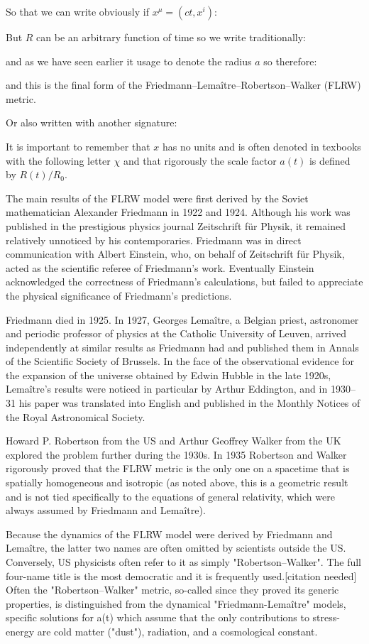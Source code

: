 	So that we can write obviously if $x^\mu=(ct,x^i)$:
	
	But $R$ can be an arbitrary function of time so we write traditionally:
	
	and as we have seen earlier it usage to denote the radius $a$ so therefore:
	
	and this is the final form of the Friedmann–Lemaître–Robertson–Walker (FLRW) metric.
	
	Or also written with another signature:
	
	
	It is important to remember that $x$ has no units and is often denoted in texbooks with the following letter $\chi$ and that rigorously the scale factor $a(t)$ is defined by $R(t)/R_0$.

	The main results of the FLRW model were first derived by the Soviet mathematician Alexander Friedmann in 1922 and 1924. Although his work was published in the prestigious physics journal Zeitschrift für Physik, it remained relatively unnoticed by his contemporaries. Friedmann was in direct communication with Albert Einstein, who, on behalf of Zeitschrift für Physik, acted as the scientific referee of Friedmann's work. Eventually Einstein acknowledged the correctness of Friedmann's calculations, but failed to appreciate the physical significance of Friedmann's predictions.
	
	Friedmann died in 1925. In 1927, Georges Lemaître, a Belgian priest,	astronomer and periodic professor of physics at the Catholic University of Leuven, arrived independently at similar results as Friedmann had and published them in Annals of the Scientific Society of Brussels. In the face of the observational evidence for the expansion of the universe obtained by Edwin Hubble in the late 1920s, Lemaître's results were noticed in particular by Arthur Eddington, and in 1930–31 his paper was translated into English and published in the Monthly Notices of the Royal Astronomical Society.

	Howard P. Robertson from the US and Arthur Geoffrey Walker from the UK explored the problem further during the 1930s. In 1935 Robertson and Walker rigorously proved that the FLRW metric is the only one on a spacetime that is spatially homogeneous and isotropic (as noted above, this is a geometric result and is not tied specifically to the equations of general relativity, which were always assumed by Friedmann and Lemaître).

	Because the dynamics of the FLRW model were derived by Friedmann and Lemaître, the latter two names are often omitted by scientists outside the US. Conversely, US physicists often refer to it as simply "Robertson–Walker". The full four-name title is the most democratic and it is frequently used.[citation needed] Often the "Robertson–Walker" metric, so-called since they proved its generic properties, is distinguished from the dynamical "Friedmann-Lemaître" models, specific solutions for a(t) which assume that the only contributions to stress-energy are cold matter ("dust"), radiation, and a cosmological constant.
	
